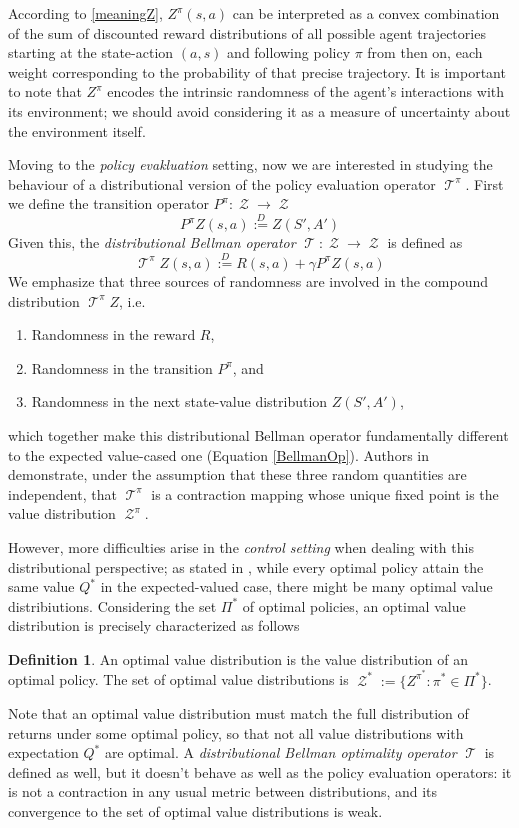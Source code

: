\documentclass[12pt,a4paper,openright,twoside]{article}
\DeclareMathOperator*{\T}{\mathcal{T}}
\DeclareMathOperator*{\Z}{\mathcal{Z}}
\numberwithin{equation}{section}
\theoremstyle{definition}
\newtheorem{definition}{Definition}
\theoremstyle{remark}
\theoremstyle{plain}
\begin{document}
According to \ref{meaningZ}, $Z^{\pi}(s,a)$ can be interpreted as a convex combination of the sum of discounted reward distributions of all possible agent trajectories starting at the state-action $(a,s)$ and following policy $\pi$ from then on, each weight corresponding to the probability of that precise trajectory. It is important to note that $Z^\pi$ encodes the intrinsic randomness of the agent's interactions with its environment; we should avoid considering it as a measure of uncertainty about the environment itself.

Moving to the \textit{policy evakluation} setting, now we are interested in studying the behaviour of a distributional version of the policy evaluation operator $\T^\pi$. First we define the transition operator $P^\pi : \Z \rightarrow \Z$ 
\begin{equation} \label{distTransitionOp}
	P^\pi Z(s,a) \stackrel{D}{:=} Z(S',A')
\end{equation}
Given this, the \textit{distributional Bellman operator} $\T : \Z \rightarrow \Z$ is defined as
\begin{equation} \label{distBellmanOp}
	{\T}^\pi Z(s,a) \stackrel{D}{:=} R(s,a) + \gamma P^{\pi} Z(s,a)
\end{equation}
We emphasize that three sources of randomness are involved in the compound distribution ${\T}^\pi Z$, i.e.
\begin{enumerate}
	\item Randomness in the reward $R$,
	\item Randomness in the transition $P^\pi$, and
	\item Randomness in the next state-value distribution $Z(S', A')$,
\end{enumerate} 
which together make this distributional Bellman operator fundamentally different to the expected value-cased one (Equation \ref{BellmanOp}). Authors in \cite{DRL} demonstrate, under the assumption that these three random quantities are independent, that ${\T}^\pi$ is a contraction mapping whose unique fixed point is the value distribution $\Z^\pi$.


However, more difficulties arise in the \textit{control setting} when dealing with this distributional perspective; as stated in \cite{DRL}, while every optimal policy attain the same value $Q^*$ in the expected-valued case, there might be many optimal value distribiutions. Considering the set $\Pi^*$ of optimal policies, an optimal value distribution is precisely characterized as follows
\begin{definition}
	An optimal value distribution is the value distribution of an optimal policy. The set of optimal value distributions is $\Z^* := \{ Z^{\pi^*} : \pi^* \in \Pi^* \}$.
\end{definition} 
Note that an optimal value distribution must match the full distribution of returns under some optimal policy, so that not all value distributions with expectation $Q^*$ are optimal. A \textit{distributional Bellman optimality operator} $\T$ is defined as well, but it doesn't behave as well as the policy evaluation operators: it is not a contraction in any usual metric between distributions, and its convergence to the set of optimal value distributions is weak.
\end{document}
